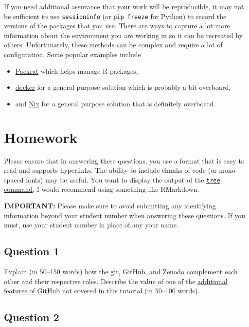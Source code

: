 \documentclass[11pt,onecolumn]{scrartcl}
\begin{document}
If you need additional assurance that your work will be reproducible, it may not
be sufficient to use \texttt{sessionInfo} (or \texttt{pip freeze} for Python) to record the
versions of the packages that you use. There are ways to capture a lot more
information about the environment you are working in so it can be recreated by
others. Unfortunately, these methods can be complex and require a lot of
configuration. Some popular examples include

\begin{itemize}
\item \href{http://rstudio.github.io/packrat/}{Packrat} which helps manage R packages,
\item \href{https://www.docker.com/}{docker} for a general purpose solution which is probably a bit overboard,
\item and \href{https://nixos.org/}{Nix} for a general purpose solution that is definitely overboard.
\end{itemize}

\section{Homework}
\label{sec:orgd4ae0e6}

Please ensure that in answering these questions, you use a format that is easy
to read and supports hyperlinks. The ability to include chunks of code (or
mono-spaced fonts) may be useful. You want to display the output of the \href{https://en.wikipedia.org/wiki/Tree\_(command)}{\texttt{tree}
command}. I would recommend using something like RMarkdown.

\textbf{IMPORTANT:} Please make sure to avoid submitting any identifying information
beyond your student number when answering these questions. If you must, use your
student number in place of any your name.

\subsection{Question 1}
\label{sec:orgdeb729c}

Explain (in 50--150 words) how the git, GitHub, and Zenodo complement each other
and their respective roles. Describe the value of one of the \hyperref[sec:orgb4f3a10]{additional features
of GitHub} not covered in this tutorial (in 50--100 words).

\subsection{Question 2}
\label{sec:org7faaa0e}
\end{document}
